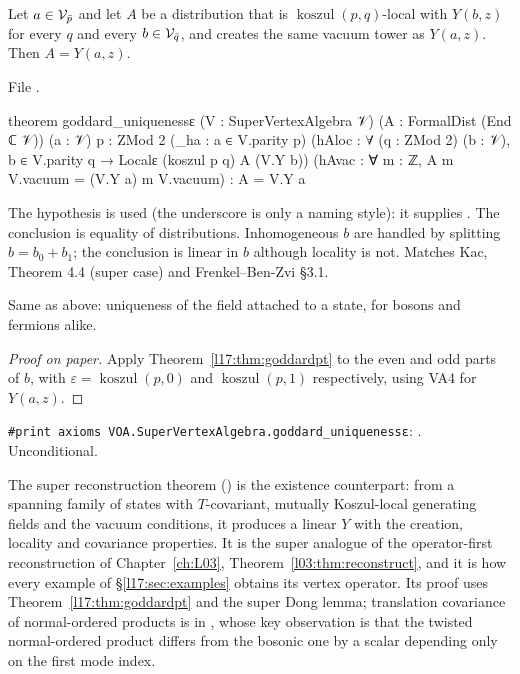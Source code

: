 \begin{theorem}\label{l17:thm:goddard}
Let $a\in\mathcal{V}_{\bar p}$ and let $A$ be a distribution that is $\operatorname{koszul}(p,q)$-local
with $Y(b,z)$ for every $q$ and every $b\in\mathcal{V}_{\bar q}$, and creates the same vacuum tower as
$Y(a,z)$. Then $A=Y(a,z)$.
\end{theorem}
\noindent File .
\begin{leancode}
theorem goddard_uniquenessε (V : SuperVertexAlgebra 𝒱) (A : FormalDist (End ℂ 𝒱)) (a : 𝒱)
    {p : ZMod 2} (_ha : a ∈ V.parity p)
    (hAloc : ∀ (q : ZMod 2) (b : 𝒱), b ∈ V.parity q → Localε (koszul p q) A (V.Y b))
    (hAvac : ∀ m : ℤ, A m V.vacuum = (V.Y a) m V.vacuum) :
    A = V.Y a
\end{leancode}
\begin{dictionary}
The hypothesis  is used (the underscore is only a naming style): it supplies
. The conclusion is equality of distributions. Inhomogeneous $b$ are
handled by splitting $b=b_0+b_1$; the conclusion is linear in $b$ although locality is not. Matches
Kac, Theorem 4.4 (super case) and Frenkel--Ben-Zvi §3.1.
\end{dictionary}
\begin{physics}
Same as above: uniqueness of the field attached to a state, for bosons and fermions alike.
\end{physics}
\begin{proof}[Proof on paper]
Apply Theorem~\ref{l17:thm:goddardpt} to the even and odd parts of $b$, with
$\varepsilon=\operatorname{koszul}(p,0)$ and $\operatorname{koszul}(p,1)$ respectively, using VA4 for
$Y(a,z)$.
\end{proof}
\begin{status}
\texttt{\#print axioms VOA.SuperVertexAlgebra.goddard\_uniquenessε}: . Unconditional.
\end{status}

The super reconstruction theorem  () is the existence counterpart: from a spanning family of states with
$T$-covariant, mutually Koszul-local generating fields and the vacuum conditions, it produces a
linear $Y$ with the creation, locality and covariance properties. It is the super analogue of the
operator-first reconstruction of Chapter~\ref{ch:L03}, Theorem~\ref{l03:thm:reconstruct}, and it is
how every example of §\ref{l17:sec:examples} obtains its vertex operator. Its proof uses
Theorem~\ref{l17:thm:goddardpt} and the super Dong lemma; translation covariance of normal-ordered
products is  in , whose key
observation is that the twisted normal-ordered product differs from the bosonic one by a scalar
depending only on the first mode index.

